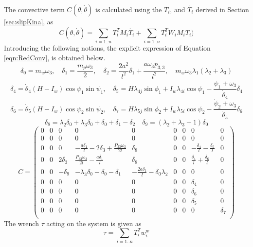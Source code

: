 {The convective term $C(\theta,\dot{\theta})$ is calculated using the $T_i$, and $\dot{T_i}$ derived in Section \ref{sec:slipKina}, as
\begin{equation}
\label{eqn:RedConv}
C(\theta,\dot{\theta})=\sum_{i=1..n}T_i^T M_i\dot{T_i}+ \sum_{i=1..n}T_i^T W_i M_i T_i)\end{equation}
Introducing the following notions, the explicit expression of Equation \ref{eqn:RedConv}, is obtained below. 
\[ \delta_0=m_w\omega_3, \quad \delta_1= \frac{m_p \omega_3}{2}, \quad \delta_2=\frac{2a^2}{l^2}\delta_1+\frac{a \omega_3 p_{3,3}}{l^2}, \quad m_w\omega_3 \lambda_1(\lambda_2+\lambda_3)\]
\[ \delta_4 = \dot\theta_4 (H-I_w)\cos{\psi_1}\sin{\psi_1},\quad \delta_5=H\lambda_{4j}\sin{\phi_1}+I_w \lambda_{4i}\cos{\psi_1}-\frac{\dot \psi_1+\omega_3}{\dot\theta_4}\delta_4  \]
\[ \delta_6 = \dot\theta_5 (H-I_w)\cos{\psi_2}\sin{\psi_2},\quad \delta_7=H\lambda_{5j}\sin{\phi_2}+I_w \lambda_{5i}\cos{\psi_2}-\frac{\dot \psi_2+\omega_3}{\dot\theta_5}\delta_6  \]
\[\delta_8=\lambda _2 \delta _0+\lambda _3 \delta _0+\delta _0+\delta _1-\delta _2 \quad \delta_9=(\lambda _2+\lambda _3 +1)\delta _0  \]
\[ C=
\left(
\begin{array}{ccccccccc}
 0 & 0 & 0 & 0 & 0 & 0 & 0 & 0 & 0 \\
 0 & 0 & 0 & 0 & 0 & 0 & 0 & 0 & 0 \\
 0 & 0 & 0 & -\frac{a \delta _1}{l}-2 \delta _3+\frac{P_{33} \omega _3}{2 l} & \delta_8 & 0 & 0 & -\frac{\delta _4}{l}-\frac{\delta _6}{l} & 0 \\
 0 & 0 & 2 \delta _3 & \frac{P_{33} \omega _3}{2 l}-\frac{a \delta _1}{l} & \delta_8 & 0 & 0 & \frac{\delta _4}{l}+\frac{\delta _6}{l} & 0 \\
 0 & 0 & -\delta_9& -\lambda _3 \delta _0-\delta _0-\delta _1 & -\frac{2 a \delta _1}{l}-\delta _0 \lambda _2 & 0 & 0 & 0 & 0 \\
 0 & 0 & 0 & 0 & 0 & 0 & 0 & \delta _4 & 0 \\
 0 & 0 & 0 & 0 & 0 & 0 & 0 & \delta _6 & 0 \\
 0 & 0 & 0 & 0 & 0 & 0 & 0 & \delta _5 & 0 \\
 0 & 0 & 0 & 0 & 0 & 0 & 0 & 0 & \delta _7 \\
\end{array}
\right)\]
The wrench $\tau$ acting on the system is given as 
\begin{equation}
\label{eqn:slipTauSum}
\tau=\sum_{i=1..n}T_i^T w^w_i
\end{equation}
\begin{figure}

\end{figure}}
